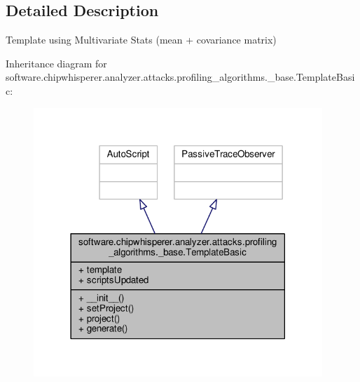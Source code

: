 \subsection{Detailed Description}
\begin{DoxyVerb}Template using Multivariate Stats (mean + covariance matrix)
\end{DoxyVerb}
 

Inheritance diagram for software.\+chipwhisperer.\+analyzer.\+attacks.\+profiling\+\_\+algorithms.\+\_\+base.\+Template\+Basic\+:\nopagebreak
\begin{figure}[H]
\begin{center}
\leavevmode
\includegraphics[width=309pt]{dc/db5/classsoftware_1_1chipwhisperer_1_1analyzer_1_1attacks_1_1profiling__algorithms_1_1__base_1_1TemplateBasic__inherit__graph}
\end{center}
\end{figure}


